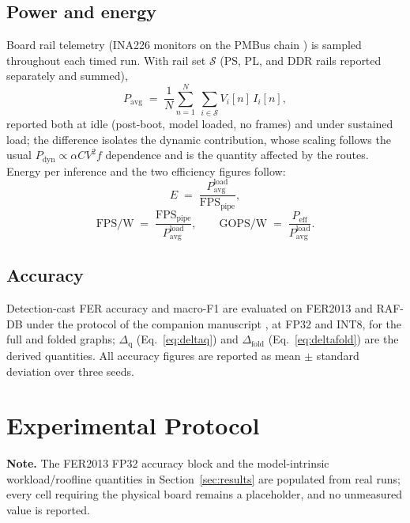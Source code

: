 \documentclass[onecolumn,journal]{IEEEtran}
\begin{document}
\subsection{Power and energy}
Board rail telemetry (INA226 monitors on the PMBus chain \cite{amd_ug1267}) is sampled
throughout each timed run. With rail set $\mathcal{S}$ (PS, PL, and DDR rails reported
separately and summed),
\begin{equation}
P_{\mathrm{avg}} \;=\; \frac{1}{N}\sum_{n=1}^{N}\ \sum_{i\in\mathcal{S}}
V_i[n]\, I_i[n],
\label{eq:power}
\end{equation}
reported both at idle (post-boot, model loaded, no frames) and under sustained load;
the difference isolates the dynamic contribution, whose scaling follows the usual
$P_{\mathrm{dyn}} \propto \alpha C V^2 f$ dependence and is the quantity affected by
the routes. Energy per inference and the two efficiency figures follow:
\begin{equation}
E \;=\; \frac{P_{\mathrm{avg}}^{\mathrm{load}}}{\mathrm{FPS}_{\mathrm{pipe}}},
\label{eq:energy}
\end{equation}
\begin{equation}
\mathrm{FPS/W} \;=\; \frac{\mathrm{FPS}_{\mathrm{pipe}}}{P_{\mathrm{avg}}^{\mathrm{load}}},
\qquad
\mathrm{GOPS/W} \;=\; \frac{P_{\mathrm{eff}}}{P_{\mathrm{avg}}^{\mathrm{load}}}.
\label{eq:effic}
\end{equation}

\subsection{Accuracy}
Detection-cast FER accuracy and macro-F1 are evaluated on FER2013
\cite{goodfellow2013fer2013} and RAF-DB \cite{li2017rafdb} under the protocol of the
companion manuscript \cite{askri2026fleo}, at FP32 and INT8, for the full and folded
graphs; $\Delta_{\mathrm{q}}$ (Eq.~\eqref{eq:deltaq}) and $\Delta_{\mathrm{fold}}$
(Eq.~\eqref{eq:deltafold}) are the derived quantities. All accuracy figures are
reported as mean $\pm$ standard deviation over three seeds.

\section{Experimental Protocol}\label{sec:setup}
\noindent\textbf{Note.} The FER2013 FP32 accuracy block and the model-intrinsic
workload/roofline quantities in Section~\ref{sec:results} are populated from real runs;
every cell requiring the physical board remains a placeholder, and no unmeasured value
is reported.
\end{document}
